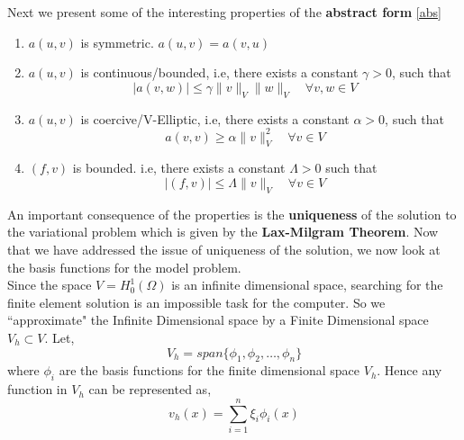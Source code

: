 Next we present some of the interesting properties of the \textbf{abstract form} \ref{abs}
\begin{enumerate}
	\item $a(u,v)$ is symmetric. $a(u,v) = a(v,u)$
	\item $a(u,v)$ is continuous/bounded, i.e, there exists a constant $\gamma>0$, such that
	\begin{equation}\nonumber
	|a(v,w)| \le \gamma \lVert v\rVert_V \lVert w \rVert_V \quad \forall v,w \in V
	\end{equation}
	\item $a(u,v) $ is coercive/V-Elliptic, i.e, there exists a constant $\alpha > 0$, such that
	\begin{equation}
	a(v,v) \ge \alpha \lVert v \rVert_V^2 \quad \forall v\in V
	\end{equation}
	\item $(f,v)$ is bounded. i.e, there exists a constant $\Lambda > 0$ such that
	\begin{equation}
	|(f,v)| \le \Lambda \lVert v \rVert_V \quad \forall v \in V
	\end{equation}	
\end{enumerate}
An important consequence of the properties is the \textbf{uniqueness} of the solution to the variational problem which is given by the \textbf{Lax-Milgram Theorem}. Now that we have addressed the issue of uniqueness of the solution, we now look at the basis functions for the model problem.\\

Since the space $V = H^1_0(\Omega)$ is an infinite dimensional space, searching for the finite element solution is an impossible task for the computer. So we ``approximate" the Infinite Dimensional space by a Finite Dimensional space $V_h \subset V$. Let,
\begin{equation}\nonumber
V_h = span\{\phi_1, \phi_2, \dots, \phi_n\}
\end{equation}
where $\phi_i$ are the basis functions for the finite dimensional space $V_h$. Hence any function in $V_h$ can be represented as,
\begin{equation}\nonumber
v_h(x) = \sum_{i=1}^{n} \xi_i \phi_i(x)
\end{equation}
\pagebreak
